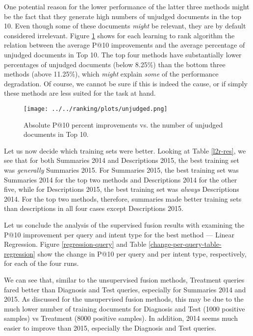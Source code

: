 One potential reason for the lower performance of the latter three methods might be the fact that they generate high
numbers of unjudged documents in the top 10. Even though some of these documents \emph{might} be relevant,
they are by default considered irrelevant.
Figure \ref{unjudged-fig} shows for each learning to rank algorithm
the relation between the average P@10 improvements and the average
percentage of unjudged documents in Top 10. The top four methods
have substantially lower percentages of unjudged documents (below 8.25\%) than the bottom
three methods (above 11.25\%), which \emph{might} explain \emph{some} of the performance degradation.
Of course, we cannot
be sure if this is indeed the cause, or if simply these methods are less suited for the task at hand.

\begin{figure}[h!]
\centerline{
  \texttt{[image: ../../ranking/plots/unjudged.png]}
  }
  \caption{Absolute P@10 percent improvements vs. the number of unjudged documents in Top 10.}
  \label{unjudged-fig}
\end{figure}

Let us now decide which training sets were better.
Looking at Table \ref{l2r-res}, we see that for both Summaries 2014 and Descriptions 2015, the best
training set was \emph{generally} Summaries 2015.
For Summaries 2015, the best training set
was Summaries 2014 for the top two methods and Descriptions 2014 for the other five,
while for Descriptions 2015, the best training set was \emph{always} Descriptions 2014.
For the top two methods, therefore, summaries made better training sets than descriptions in all
four cases except Descriptions 2015.

Let us conclude the analysis of the supervised fusion results with examining the P@10 improvement per query
and intent type
for the best method --- Linear Regression. Figure \ref{regression-query} and Table
\ref{change-per-query-table-regression} show the change in P@10
per query and per intent type, respectively, for each of the four runs.

We can see that, similar to the unsupervised fusion methods,
Treatment queries fared better than Diagnosis and Test queries, especially for Summaries 2014 and 2015.
As discussed for the unsupervised fusion methods, this may be due to the much lower number of training
documents for Diagnosis and Test (1000 positive samples) vs Treatment (8000 positive samples).
In addition, 2014 seems much easier to improve than 2015, especially the Diagnosis and Test queries.

